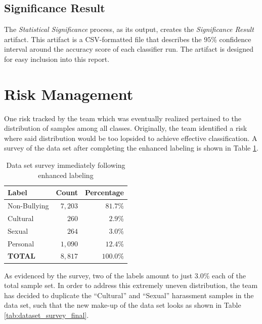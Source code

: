 \documentclass[conference]{sig-alternate-05-2015}
\begin{document}
\subsection{Significance Result}\label{subsec:stat_sig_result}
The \textit{Statistical Significance} process, as its output, creates the
\textit{Significance Result} artifact. This artifact is a CSV-formatted file
that describes the $95$\% confidence interval around the accuracy score of each
classifier run. The artifact is designed for easy inclusion into this report.

\section{Risk Management}\label{sec:expectations}

One risk tracked by the team which was eventually realized pertained to the
distribution of samples among all classes. Originally, the team identified a
risk where said distribution would be too lopsided to achieve effective
classification. A survey of the data set after completing the enhanced labeling
is shown in Table \ref{tab:dataset_survey_first}.

\begin{table}[ht!]
  \centering
  \begin{tabular}{| l | r | r |}
    \hline
    Label & Count & Percentage \\
    \hline\hline
    Non-Bullying & $7,203$ & $81.7$\% \\
    \hline
    Cultural & $260$ & $2.9$\% \\
    \hline
    Sexual & $264$ & $3.0$\% \\
    \hline
    Personal & $1,090$ & $12.4$\% \\
    \hline\hline
    \textbf{TOTAL} & $8,817$ & $100.0$\% \\
    \hline
  \end{tabular}
  \caption{Data set survey immediately following enhanced labeling}
  \label{tab:dataset_survey_first}
\end{table}

As evidenced by the survey, two of the labels amount to just $3.0$\% each of the
total sample set. In order to address this extremely uneven distribution, the
team has decided to duplicate the ``Cultural'' and ``Sexual'' harassment samples
in the data set, such that the new make-up of the data set looks as shown in
Table \ref{tab:dataset_survey_final}.
\end{document}
